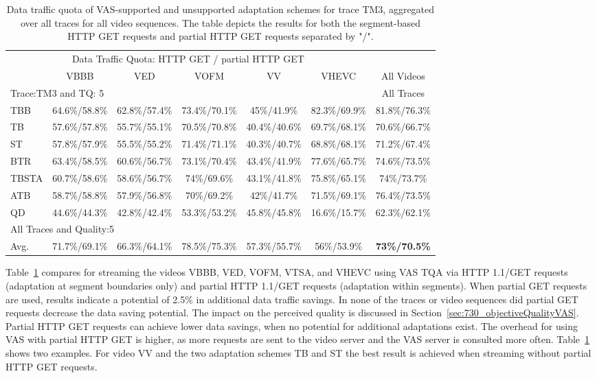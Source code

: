 \begin{table}[htb]
 \centering
 \caption[Partial HTTP GET requests in comparison to the request of segments]{Data traffic quota of VAS-supported and unsupported adaptation schemes for trace TM3, aggregated over all traces for all video sequences. The table depicts the results for both the segment-based HTTP GET requests and partial HTTP GET requests separated by "/".}
\begin{tabular}{l|ccccc|c}
  \toprule[2.0pt]
  \multicolumn{6}{c}{Data Traffic Quota: HTTP GET / partial HTTP GET}& \\
  & VBBB & VED & VOFM & VV & VHEVC & All Videos \\
  \hline
  \multicolumn{6}{l}{Trace:TM3 and TQ: 5} & All Traces\\
  \hline
  TBB&64.6\%/58.8\%&62.8\%/57.4\%&73.4\%/70.1\%&45\%/41.9\%&82.3\%/69.9\%&81.8\%/76.3\%\\
  TB&57.6\%/57.8\%&55.7\%/55.1\%&70.5\%/70.8\%&40.4\%/40.6\%&69.7\%/68.1\%&70.6\%/66.7\%\\
  ST&57.8\%/57.9\%&55.5\%/55.2\%&71.4\%/71.1\%&40.3\%/40.7\%&68.8\%/68.1\%&71.2\%/67.4\%\\
  BTR&63.4\%/58.5\%&60.6\%/56.7\%&73.1\%/70.4\%&43.4\%/41.9\%&77.6\%/65.7\%&74.6\%/73.5\%\\
  TBSTA&60.7\%/58.6\%&58.6\%/56.7\%&74\%/69.6\%&43.1\%/41.8\%&75.8\%/65.1\%&74\%/73.7\%\\
  ATB&58.7\%/58.8\%&57.9\%/56.8\%&70\%/69.2\%&42\%/41.7\%&71.5\%/69.1\%&76.4\%/73.5\%\\
  QD&44.6\%/44.3\%&42.8\%/42.4\%&53.3\%/53.2\%&45.8\%/45.8\%&16.6\%/15.7\%&62.3\%/62.1\%\\
  \hline
  \multicolumn{6}{l}{All Traces and Quality:5}&\\
  \hline
  Avg.&71.7\%/69.1\%&66.3\%/64.1\%&78.5\%/75.3\%&57.3\%/55.7\%&56\%/53.9\%&\textbf{73\%/70.5\%}\\
  \bottomrule[2.0pt]
 \end{tabular}%
 \label{tab:730_trafficReductionPartialGet}
\end{table}
Table~\ref{tab:730_trafficReductionPartialGet} compares for streaming the videos VBBB, VED, VOFM, VTSA, and VHEVC using \ac{VAS} \ac{TQA} via HTTP 1.1/GET requests (adaptation at segment boundaries only) and partial HTTP 1.1/GET requests (adaptation within segments).
When partial GET requests are used, results indicate a potential of 2.5\% in additional data traffic savings.
In none of the traces or video sequences did partial GET requests decrease the data saving potential.
The impact on the perceived quality is discussed in Section~\ref{sec:730_objectiveQualityVAS}. 
Partial HTTP GET requests can achieve lower data savings, when no potential for additional adaptations exist.
The overhead for using \ac{VAS} with partial HTTP GET is higher, as more requests are sent to the video server and the \ac{VAS} server is consulted more often.
Table~\ref{tab:730_trafficReductionPartialGet} shows two examples.
For video VV and the two adaptation schemes TB and ST the best result is achieved when streaming without partial HTTP GET requests.
